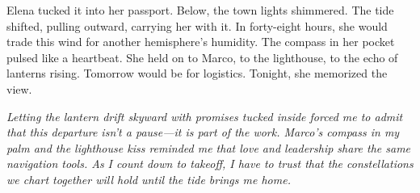 Elena tucked it into her passport. Below, the town lights shimmered. The tide shifted, pulling outward, carrying her with it. In forty-eight hours, she would trade this wind for another hemisphere's humidity. The compass in her pocket pulsed like a heartbeat. She held on to Marco, to the lighthouse, to the echo of lanterns rising. Tomorrow would be for logistics. Tonight, she memorized the view.

\noindent\textit{Letting the lantern drift skyward with promises tucked inside forced me to admit that this departure isn't a pause—it is part of the work. Marco's compass in my palm and the lighthouse kiss reminded me that love and leadership share the same navigation tools. As I count down to takeoff, I have to trust that the constellations we chart together will hold until the tide brings me home.}

